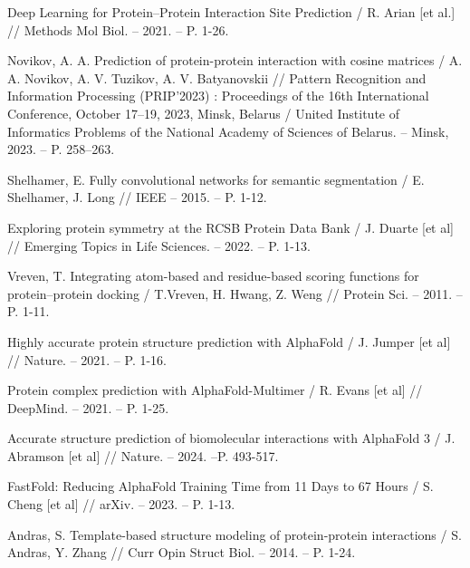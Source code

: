 \newpage
{} %
\renewcommand{\bibsection}{\centering\textbf{\large СПИСОК ИСПОЛЬЗОВАННЫХ ИСТОЧНИКОВ}} %
%

%

\begin{thebibliography}{9}

Deep Learning for Protein–Protein Interaction Site Prediction / R. Arian [et al.] // Methods Mol Biol. – 2021. – P. 1-26.

Novikov, A. A. Prediction of protein-protein interaction with cosine matrices / A. A. Novikov, A. V. Tuzikov, A. V. Batyanovskii // Pattern Recognition and Information Processing (PRIP'2023) : Proceedings of the 16th International Conference, October 17–19, 2023, Minsk, Belarus / United Institute of Informatics Problems of the National Academy of Sciences of Belarus. – Minsk, 2023. – P. 258–263.

Shelhamer, E. Fully convolutional networks for semantic segmentation / E. Shelhamer, J. Long // IEEE – 2015. – P. 1-12.

Exploring protein symmetry at the RCSB Protein Data Bank / J. Duarte [et al] // Emerging Topics in Life Sciences. – 2022. – P. 1-13.

Vreven, T. Integrating atom-based and residue-based scoring functions for protein–protein docking / T.Vreven, H. Hwang, Z. Weng // Protein Sci. – 2011. – P. 1-11.

Highly accurate protein structure prediction with AlphaFold / J. Jumper [et al] // Nature. – 2021. – P. 1-16.

Protein complex prediction with AlphaFold-Multimer / R. Evans [et al] // DeepMind. – 2021. – P. 1-25.

Accurate structure prediction of biomolecular interactions with AlphaFold 3 / J. Abramson [et al] // Nature. -- 2024. --P. 493-517.

FastFold: Reducing AlphaFold Training Time from 11 Days to 67 Hours / S. Cheng [et al] // arXiv. – 2023. – P. 1-13.

Andras, S. Template-based structure modeling of protein-protein interactions / S. Andras, Y. Zhang // Curr Opin Struct Biol. – 2014. – P. 1-24.


\end{thebibliography}
